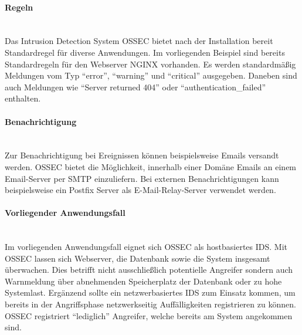 \paragraph{Regeln}
\noindent \\Das Intrusion Detection System OSSEC bietet nach der Installation bereit Standardregel für diverse Anwendungen. Im vorliegenden Beispiel sind bereits Standardregeln für den Webserver NGINX vorhanden. Es werden standardmäßig Meldungen vom Typ "`error"', "`warning"' und "`critical"' ausgegeben. Daneben sind auch Meldungen wie "`Server returned 404"' oder "`authentication\_failed"' enthalten. 

\paragraph{Benachrichtigung}
\noindent \\Zur Benachrichtigung bei Ereignissen können beispielsweise Emails versandt werden. OSSEC bietet die Möglichkeit, innerhalb einer Domäne Emails an einem Email-Server per SMTP einzuliefern. Bei externen Benachrichtigungen kann beispielsweise ein Postfix Server als E-Mail-Relay-Server verwendet werden.  

\paragraph{Vorliegender Anwendungsfall}
\noindent \\Im vorliegenden Anwendungsfall eignet sich OSSEC als hostbasiertes IDS. Mit OSSEC lassen sich Webserver, die Datenbank sowie die System insgesamt überwachen. Dies betrifft nicht ausschließlich potentielle Angreifer sondern auch Warnmeldung über abnehmenden Speicherplatz der Datenbank oder zu hohe Systemlast. Ergänzend sollte ein netzwerbasiertes IDS zum Einsatz kommen, um bereits in der Angriffsphase netzwerkseitig Auffälligkeiten registrieren zu können. OSSEC registriert "`lediglich"' Angreifer, welche bereits am System angekommen sind. 
